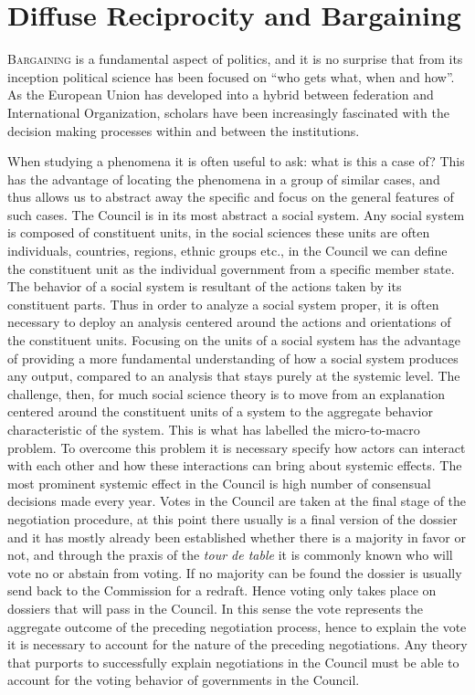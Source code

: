 \chapter{Diffuse Reciprocity and Bargaining}
\label{chapter:theory}

\lettrine{B}{argaining} is a fundamental aspect of politics, and it is no surprise that from its inception political science has been focused on ``who gets what, when and how''.  As the European Union has developed into a hybrid between federation and International Organization, scholars have been increasingly fascinated with the decision making processes within and between the institutions. 

When studying a phenomena it is often useful to ask: what is this a case of? This has the advantage of locating the phenomena in a group of similar cases, and thus allows us to abstract away the specific and focus on the general features of such cases. The Council is in its most abstract a social system. Any social system is composed of constituent units, in the social sciences these units are often individuals, countries, regions, ethnic groups etc., in the Council we can define the constituent unit as the individual government from a specific member state. The behavior of a social system is resultant of the actions taken by its constituent parts. Thus in order to analyze a social system proper, it is often necessary to deploy an analysis centered around the actions and orientations of the constituent units. Focusing on the units of a social system has the advantage of providing a more fundamental understanding of how a social system produces any output, compared to an analysis that stays purely at the systemic level. The challenge, then, for much social science theory is to move from an explanation centered around the constituent units of a system to the aggregate behavior characteristic of the system. This is what \citet{Coleman1990} has labelled the micro-to-macro problem. To overcome this problem it is necessary specify how actors can interact with each other and how these interactions can bring about systemic effects. The most prominent systemic effect in the Council is high number of consensual decisions made every year. Votes in the Council are taken at the final stage of the negotiation procedure, at this point there usually is a final version of the dossier and it has mostly already been established whether there is a majority in favor or not, and through the praxis of the \textsl{tour de table} it is commonly known who will vote no or abstain from voting. If no majority can be found the dossier is usually send back  to the Commission for a redraft. Hence voting only takes place on dossiers that will pass in the Council. In this sense the vote represents the aggregate outcome of the preceding negotiation process, hence to explain the vote it is necessary to account for the nature of the preceding negotiations. Any theory that purports to successfully explain negotiations in the Council must be able to account for the voting behavior of governments in the Council.

